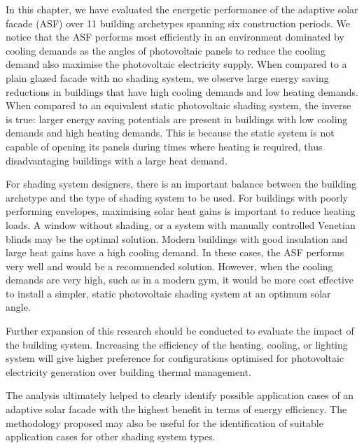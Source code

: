 
In this chapter, we have evaluated the energetic performance of the adaptive solar facade (ASF) over 11 building archetypes spanning six construction periods. We notice that the ASF performs most efficiently in an environment dominated by cooling demands as the angles of photovoltaic panels to reduce the cooling demand also maximise the photovoltaic electricity supply. When compared to a plain glazed facade with no shading system, we observe large energy saving reductions in buildings that have high cooling demands and low heating demands. When compared to an equivalent static photovoltaic shading system, the inverse is true: larger energy saving potentials are present in buildings with low cooling demands and high heating demands. This is because the static system is not capable of opening its panels during times where heating is required, thus disadvantaging buildings with a large heat demand. 

For shading system designers, there is an important balance between the building archetype and the type of shading system to be used. For buildings with poorly performing envelopes, maximising solar heat gains is important to reduce heating loads. A window without shading, or a system with manually controlled Venetian blinds may be the optimal solution. Modern buildings with good insulation and large heat gains have a high cooling demand. In these cases, the ASF performs very well and would be a recommended solution. However, when the cooling demands are very high, such as in a modern gym, it would be more cost effective to install a simpler, static photovoltaic shading system at an optimum solar angle. 

Further expansion of this research should be conducted to evaluate the impact of the building system. Increasing the efficiency of the heating, cooling, or lighting system will give higher preference for configurations optimised for photovoltaic electricity generation over building thermal management. 

The analysis ultimately helped to clearly identify possible application cases of an adaptive solar facade with the highest benefit in terms of energy efficiency. The methodology proposed may also be useful for the identification of suitable application cases for other shading system types. 




